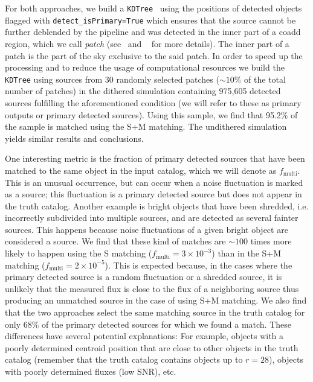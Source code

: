\documentclass[a4paper,fleqn,usenatbib]{mnras}
\begin{document}
For both approaches, we build a \texttt{KDTree}~\citep{scikit-learn} using the positions of detected objects flagged with \texttt{detect\_isPrimary=True} which ensures that the source cannot be further deblended by the pipeline and was detected in the inner part of a coadd region, which we call \textit{patch} (see~\citet{2018PASJ...70S...5B} and ~\citet{2018PASJ...70S..25M} for more details). The inner part of a patch is the part of the sky exclusive to the said patch. In order to speed up the processing and to reduce the usage of computational resources we build the \texttt{KDTree} using sources from 30 randomly selected patches ($\sim 10\%$ of the total number of patches) in the dithered simulation containing 975,605 detected sources fulfilling the aforementioned condition (we will refer to these as primary outputs or primary detected sources). Using this sample, we find that 95.2\% of the sample is matched using the \textsf{S+M} matching. The undithered simulation yields similar results and conclusions. 

One interesting metric is the fraction of primary detected sources that have been matched to the same object in the input catalog, which we will denote as $f_{\mathrm{multi}}$. This is an unusual occurrence, but can occur when a noise fluctuation is marked as a source; this fluctuation is a primary detected source but does not appear in the truth catalog. Another example is bright objects that have been shredded, i.e. incorrectly subdivided into multiple sources, and are detected as several fainter sources. This happens because noise fluctuations of a given bright object are considered a source. We find that these kind of matches are $\sim 100$ times more likely to happen using the \textsf{S} matching ($f_{\mathrm{multi}} = 3 \times 10^{-3}$) than in the \textsf{S+M} matching ($ f_{\mathrm{multi}} = 2 \times 10^{-5}$). This is expected because, in the cases where the primary detected source is a random fluctuation or a shredded source, it is unlikely that the measured flux is close to the flux of a neighboring source thus producing an unmatched source in the case of using \textsf{S+M} matching. We also find that the two approaches select the same matching source in the truth catalog for only 68\% of the primary detected sources for which we found a match. These differences have several potential explanations: For example, objects with a poorly determined centroid position that are close to other objects in the truth catalog (remember that the truth catalog contains objects up to $r=28$), objects with poorly determined fluxes (low SNR), etc.
\end{document}
